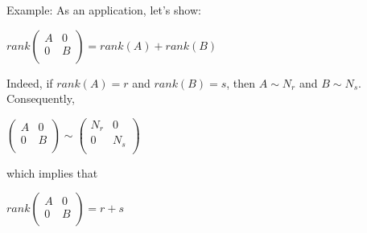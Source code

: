 \documentclass[UTF8,a4paper, 10pt, openany]{book}
\begin{document}
Example:
As an application, let's show:
\begin{center}
$rank
\begin{pmatrix}
A & 0 \\
0 & B \\
\end{pmatrix}
= rank(A)+rank(B)$
\end{center}
Indeed, if $rank(A)=r$ and $rank(B)=s$, then $A\sim N_r$ and $B\sim N_s$.\\
Consequently, 
\begin{center}
$\begin{pmatrix}
A & 0 \\
0 & B \\
\end{pmatrix}\sim 
\begin{pmatrix}
N_r & 0 \\
0 & N_s \\
\end{pmatrix}$
\end{center}
which implies that
\begin{center}
$rank 
\begin{pmatrix}
A & 0 \\
0 & B \\
\end{pmatrix}=r+s$
\end{center}
\end{document}
